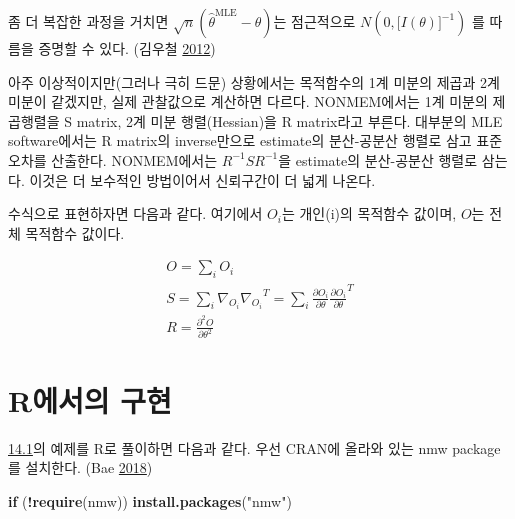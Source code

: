 \documentclass[
  10pt,
  krantz2,
  a4paper]{krantz}
\newenvironment{Shaded}{\begin{snugshade}}{\end{snugshade}}
\newcommand{\ControlFlowTok}[1]{\textcolor[rgb]{0.13,0.29,0.53}{\textbf{#1}}}
\newcommand{\KeywordTok}[1]{\textcolor[rgb]{0.13,0.29,0.53}{\textbf{#1}}}
\newcommand{\NormalTok}[1]{#1}
\newcommand{\OperatorTok}[1]{\textcolor[rgb]{0.81,0.36,0.00}{\textbf{#1}}}
\newcommand{\StringTok}[1]{\textcolor[rgb]{0.31,0.60,0.02}{#1}}
\theoremstyle{definition}
\theoremstyle{definition}
\theoremstyle{definition}
\theoremstyle{remark}
\begin{document}
좀 더 복잡한 과정을 거치면 \(\sqrt{n}({\widehat{\theta}}^{\text{MLE}} - \theta)\)는 점근적으로 \(N(0,\lbrack I(\theta)\rbrack^{- 1})\) 를 따름을 증명할 수 있다. (김우철 \protect\hyperlink{ref-kim}{2012})

아주 이상적이지만(그러나 극히 드문) 상황에서는 목적함수의 1계 미분의 제곱과 2계 미분이 같겠지만, 실제 관찰값으로 계산하면
다르다. NONMEM에서는 1계 미분의 제곱행렬을 S matrix, 2계 미분 행렬(Hessian)을 R matrix라고
부른다. 대부분의 MLE software에서는 R matrix의 inverse만으로 estimate의 분산-공분산 행렬로 삼고
표준오차를 산출한다. NONMEM에서는 \(R^{- 1}SR^{- 1}\)을 estimate의 분산-공분산 행렬로 삼는다. 이것은
더 보수적인 방법이어서 신뢰구간이 더 넓게 나온다.

수식으로 표현하자면 다음과 같다. 여기에서 \(O_{i}\)는 개인(i)의 목적함수 값이며, \(O\)는 전체 목적함수 값이다.

\begin{equation}
\begin{split}
O = \sum_{i}^{}O_{i} \\
S = \sum_{i}^{}{\nabla_{O_{i}}{\nabla_{O_{i}}}^{T}} = \sum_{i}^{}\frac{\partial O_{i}}{\partial\theta}\frac{\partial O_{i}}{\partial\theta}^{T} \\
R = \frac{\partial^{2}O}{\partial\theta^{2}}
\end{split}
\label{eq:o-s-r}
\end{equation}

\hypertarget{ruxc5d0uxc11cuxc758-uxad6cuxd604}{%
\section{R에서의 구현}\label{ruxc5d0uxc11cuxc758-uxad6cuxd604}}

\protect\hyperlink{actual-example}{14.1}의 예제를 R로 풀이하면 다음과 같다. 우선 CRAN에 올라와 있는 nmw package를 설치한다. (Bae \protect\hyperlink{ref-R-nmw}{2018})

\begin{Shaded}
\begin{Highlighting}[]
\ControlFlowTok{if}\NormalTok{ (}\OperatorTok{!}\KeywordTok{require}\NormalTok{(nmw)) }\KeywordTok{install.packages}\NormalTok{(}\StringTok{"nmw"}\NormalTok{)}
\end{Highlighting}
\end{Shaded}
\end{document}
